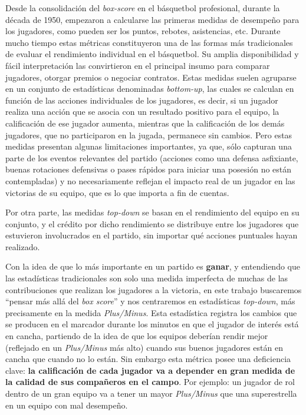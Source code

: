 \documentclass[
]{article}
\begin{document}
Desde la consolidación del \emph{box-score} en el básquetbol
profesional, durante la década de 1950, empezaron a calcularse las
primeras medidas de desempeño para los jugadores, como pueden ser los
puntos, rebotes, asistencias, etc. Durante mucho tiempo estas métricas
constituyeron una de las formas más tradicionales de evaluar el
rendimiento individual en el básquetbol. Su amplia disponibilidad y
fácil interpretación las convirtieron en el principal insumo para
comparar jugadores, otorgar premios o negociar contratos. Estas medidas
suelen agruparse en un conjunto de estadísticas denominadas
\emph{bottom-up}, las cuales se calculan en función de las acciones
individuales de los jugadores, es decir, si un jugador realiza una
acción que se asocia con un resultado positivo para el equipo, la
calificación de ese jugador aumenta, mientras que la calificación de los
demás jugadores, que no participaron en la jugada, permanece sin
cambios. Pero estas medidas presentan algunas limitaciones importantes,
ya que, sólo capturan una parte de los eventos relevantes del partido
(acciones como una defensa asfixiante, buenas rotaciones defensivas o
pases rápidos para iniciar una posesión no están contempladas) y no
necesariamente reflejan el impacto real de un jugador en las victorias
de su equipo, que es lo que importa a fin de cuentas.

Por otra parte, las medidas \emph{top-down} se basan en el rendimiento
del equipo en su conjunto, y el crédito por dicho rendimiento se
distribuye entre los jugadores que estuvieron involucrados en el
partido, sin importar qué acciones puntuales hayan realizado.

Con la idea de que lo más importante en un partido es \textbf{ganar}, y
entendiendo que las estadísticas tradicionales son solo una medida
imperfecta de muchas de las contribuciones que realizan los jugadores a
la victoria, en este trabajo buscaremos ``pensar más allá del \emph{box
score}'' y nos centraremos en estadísticas \emph{top-down}, más
precisamente en la medida \emph{Plus/Minus}. Esta estadística registra
los cambios que se producen en el marcador durante los minutos en que el
jugador de interés está en cancha, partiendo de la idea de que los
equipos deberían rendir mejor (reflejado en un \emph{Plus/Minus} más
alto) cuando sus buenos jugadores están en cancha que cuando no lo
están. Sin embargo esta métrica posee una deficiencia clave: \textbf{la
calificación de cada jugador va a depender en gran medida de la calidad
de sus compañeros en el campo}. Por ejemplo: un jugador de rol dentro de
un gran equipo va a tener un mayor \emph{Plus/Minus} que una
superestrella en un equipo con mal desempeño.
\end{document}
